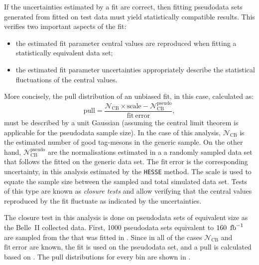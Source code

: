 If the uncertainties estimated by a fit are correct, then fitting pseudodata sets generated from  fitted on test data must yield statistically compatible results.
This verifies two important aspects of the fit:
\begin{itemize}
    \item the estimated fit parameter central values are reproduced when fitting a statistically equivalent data set;
    \item the estimated fit parameter uncertainties appropriately describe the statistical fluctuations of the central values.
\end{itemize}

More concisely, the pull distribution of an unbiased fit, in this case, calculated as:
\begin{equation}\label{eq:toy_pull}
    \mathrm{pull} = \frac{\mathcal{N}_{\mathrm{CB}}\times \mathrm{scale} - \mathcal{N}_{\mathrm{CB}}^{\mathrm{pseudo}}}{\mathrm{fit~error}},
\end{equation}
must be described by a unit Gaussian (assuming the central limit theorem is applicable for the pseudodata sample size).
In the case of this analysis, $\mathcal{N}_{\mathrm{CB}}$ is the estimated number of good tag-\B mesons in the generic \MC sample.
On the other hand, $\mathcal{N}^{\mathrm{pseudo}}_{\mathrm{CB}}$ are the normalisations estimated in a a randomly sampled data set that follows the  fitted on the generic \MC data set.
The $\mathrm{fit~error}$ is the corresponding uncertainty, in this analysis estimated by the \texttt{HESSE} method.
The $\mathrm{scale}$ is used to equate the sample size between the sampled and total simulated data set.
Tests of this type are known as \textit{closure tests} and allow verifying that the central values reproduced by the fit fluctuate as indicated by the \PDF uncertainties.

The closure test in this analysis is done on pseudodata sets of equivalent size as the Belle~II collected data.
First, 1000 pseudodata sets equivalent to $\mathrm{160~\mbox{\,fb}^{-1}}$ are sampled from the \PDF that was fitted in .
Since in all of the cases $\mathcal{N}_{\mathrm{CB}}$ and $\mathrm{fit~error}$ are known, the \Mbc fit is used on the pseudodata set, and a $\mathrm{pull}$ is calculated based on .
The pull distributions for every \EB bin are shown in .


